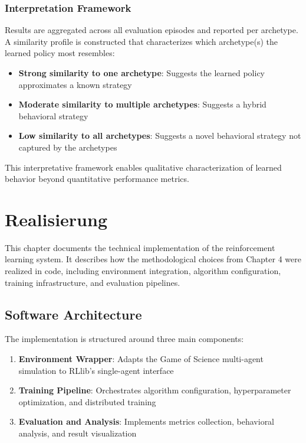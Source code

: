 \documentclass[english,bachelor]{hsluthesis}
\begin{document}
\subsection{Interpretation Framework}

Results are aggregated across all evaluation episodes and reported per archetype. A similarity profile is constructed that characterizes which archetype(s) the learned policy most resembles:

\begin{itemize}
    \item \textbf{Strong similarity to one archetype}: Suggests the learned policy approximates a known strategy
    \item \textbf{Moderate similarity to multiple archetypes}: Suggests a hybrid behavioral strategy
    \item \textbf{Low similarity to all archetypes}: Suggests a novel behavioral strategy not captured by the archetypes
\end{itemize}

This interpretative framework enables qualitative characterization of learned behavior beyond quantitative performance metrics.

\chapter{Realisierung}

This chapter documents the technical implementation of the reinforcement learning system. It describes how the methodological choices from Chapter 4 were realized in code, including environment integration, algorithm configuration, training infrastructure, and evaluation pipelines.

\section{Software Architecture}

The implementation is structured around three main components:

\begin{enumerate}
    \item \textbf{Environment Wrapper}: Adapts the Game of Science multi-agent simulation to RLlib's single-agent interface
    \item \textbf{Training Pipeline}: Orchestrates algorithm configuration, hyperparameter optimization, and distributed training
    \item \textbf{Evaluation and Analysis}: Implements metrics collection, behavioral analysis, and result visualization
\end{enumerate}
\end{document}
